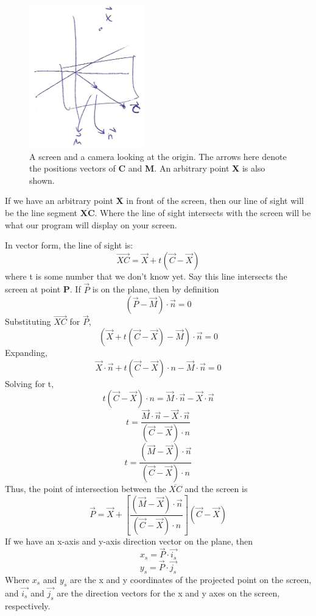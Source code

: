 \documentclass[12pt]{article}
\begin{document}
		\begin{figure}[ht!] 
		\centering
		\includegraphics[width=5cm]{2.png}
		\caption{A screen and a camera looking at the origin. The arrows here denote the positions vectors of \textbf{C} and \textbf{M}. An arbitrary point \textbf{X} is also shown.} \label{im:2}		
		\end{figure}

	If we have an arbitrary point \textbf{X} in front of the screen, then our line of sight will be the line segment $\overline{\textbf{XC}}$. Where the line of sight intersects with the screen will be what our program will display on your screen.
	
	In vector form, the line of sight is:	
			$$\overrightarrow{XC} = \vec{X} + t(\vec{C}-\vec{X})$$			
	where t is some number that we don't know yet. Say this line intersects the screen at point \textbf{P}. If $\vec{P}$ is on the plane, then by definition
			$$(\vec{P} - \vec{M}) \cdot \vec{n} = 0$$
	Substituting $\overrightarrow{XC}$ for $\vec{P}$,	
			$$(\vec{X} + t(\vec{C} - \vec{X}) - \vec{M}) \cdot \vec{n} = 0$$
	Expanding,
			$$\vec{X} \cdot \vec{n} + t(\vec{C}-\vec{X}) \cdot{n} - \vec{M} \cdot \vec{n} = 0$$
	Solving for t,
			$$t(\vec{C}-\vec{X}) \cdot{n} = \vec{M} \cdot \vec{n} - \vec{X} \cdot \vec{n}$$
			$$t = \frac{\vec{M} \cdot \vec{n} - \vec{X} \cdot \vec{n}}{(\vec{C}-\vec{X}) \cdot{n}}$$
			$$t = \frac{(\vec{M} - \vec{X}) \cdot \vec{n}}{(\vec{C}-\vec{X}) \cdot{n}}$$
	Thus, the point of intersection between the $\overline{XC}$ and the screen is
			$$\vec{P} = \vec{X} + \left[\frac{(\vec{M} - \vec{X}) \cdot \vec{n}}{(\vec{C}-\vec{X}) \cdot{n}}\right](\vec{C} - \vec{X})$$
	If we have an x-axis and y-axis direction vector on the plane, then
			$$x_{s} = \vec{P} \cdot \vec{i_{s}}$$
			$$y_{s} = \vec{P} \cdot \vec{j_{s}}$$
	Where $x_{s}$ and $y_{s}$ are the x and y coordinates of the projected point on the screen, and $\vec{i_{s}}$ and $\vec{j_{s}}$ are the direction vectors for the x and y axes on the screen, respectively.
\end{document}
